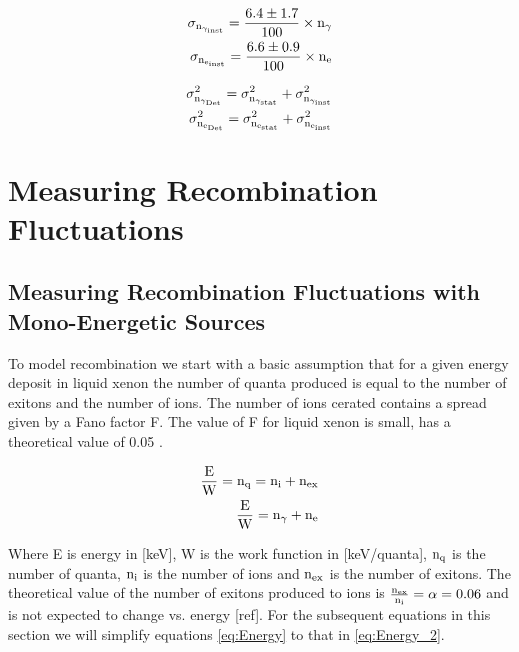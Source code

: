 \begin{equation}
\begin{split}
\rm  \sigma_{n_{\gamma_{inst}}} = \frac{6.4\pm 1.7}{100} \times n_\gamma\\
\rm  \sigma_{n_{e_{inst}}} = \frac{6.6\pm 0.9}{100} \times n_e
\label{eq:SigInst}
\end{split}
\end{equation}

\begin{equation}
\begin{split}
\rm  \sigma_{n_{\gamma_{Det}}}^2 = \sigma_{n_{\gamma_{stat}}}^2 + \sigma_{n_{\gamma_{inst}}}^2 \\
\rm \sigma_{n_{e_{Det}}}^2 = \sigma_{n_{e_{stat}}}^2 + \sigma_{n_{e_{inst}}}^2
\label{eq:SigDet}
\end{split}
\end{equation}



\section{Measuring Recombination Fluctuations}

\subsection{Measuring Recombination Fluctuations with Mono-Energetic Sources}
\label{sec:flucs_mono}

To model recombination we start with a basic assumption that for a given energy deposit in liquid xenon the number of quanta produced is equal to the number of exitons and the number of ions. The number of ions cerated contains a spread given by a Fano factor F. The value of F for liquid xenon is small, has a theoretical value of 0.05 \cite{FanoTheoretical}.

\begin{equation}
\begin{split}
\rm  \frac{E}{W} = n_q = n_i + n_{ex}\\
\rm \frac{E}{W} = n_\gamma + n_e
\label{eq:Energy}
\end{split}
\end{equation}

Where E is energy in [keV], W is the work function in [keV/quanta], $\rm n_{q}$ is the number of quanta, $\rm n_{i}$ is the number of ions and $\rm n_{ex}$ is the number of exitons. The theoretical value of the number of exitons produced to ions is $\rm \frac{n_{ex}}{n_{i}}= \alpha = 0.06$ and is not expected to change vs. energy [ref]. For the subsequent equations in this section we will simplify equations \ref{eq:Energy} to that in \ref{eq:Energy_2}.

